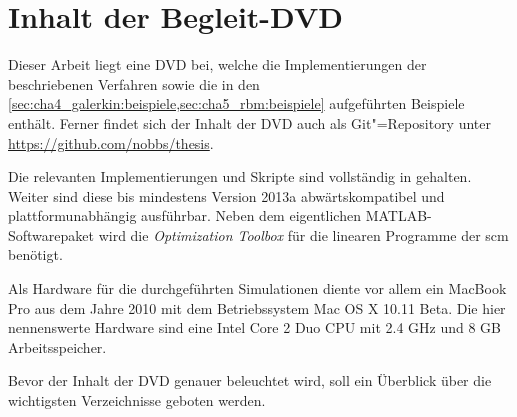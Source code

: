 \documentclass[../main.tex]{subfiles}
\begin{document}
\chapter{Inhalt der Begleit-DVD} %
\label{cha:inhalt_der_begleit_dvd}

Dieser Arbeit liegt eine DVD bei, welche die Implementierungen der beschriebenen Verfahren sowie die in den \cref{sec:cha4_galerkin:beispiele,sec:cha5_rbm:beispiele} aufgeführten Beispiele enthält.
Ferner findet sich der Inhalt der DVD auch als Git"=Repository unter \url{https://github.com/nobbs/thesis}.

Die relevanten Implementierungen und Skripte sind vollständig in \textcite{Matlab} gehalten.
Weiter sind diese bis mindestens Version 2013a abwärtskompatibel und plattformunabhängig ausführbar.
Neben dem eigentlichen MATLAB-Softwarepaket wird die \emph{Optimization Toolbox} für die linearen Programme der \acl{scm} benötigt.

Als Hardware für die durchgeführten Simulationen diente vor allem ein MacBook Pro aus dem Jahre 2010 mit dem Betriebssystem Mac OS X 10.11 Beta.
Die hier nennenswerte Hardware sind eine Intel Core 2 Duo CPU mit 2.4 GHz und 8 GB Arbeitsspeicher.

Bevor der Inhalt der DVD genauer beleuchtet wird, soll ein Überblick über die wichtigsten Verzeichnisse geboten werden.

\bigbreak
{}
\bigbreak

\blindtext
\end{document}
